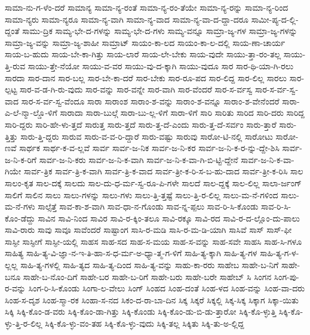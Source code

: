 {ಸಾಮಾ-ನು-ಗ-ಳೆಂ-ದರೆ
ಸಾಮಾನ್ಯ
ಸಾಮಾ-ನ್ಯ-ರಂತೆ
ಸಾಮಾ-ನ್ಯ-ರಂ-ತೆಯೇ
ಸಾಮಾ-ನ್ಯ-ರನ್ನು
ಸಾಮಾ-ನ್ಯ-ರಿಂದ
ಸಾಮಾ-ನ್ಯರು
ಸಾಮಾ-ನ್ಯರೂ
ಸಾಮಾ-ನ್ಯ-ವಾಗಿ
ಸಾಮಾ-ನ್ಯ-ವಾದ
ಸಾಮಾ-ನ್ಯ-ವಾ-ದ-ದ್ದಾ-ದರೂ
ಸಾಮೀ-ಪ್ಯ-ದ-ಲ್ಲಿ-ದ್ದಂತೆ
ಸಾಮು-ದ್ರಿಕ
ಸಾಮ್ಯ-ಭೇ-ದ-ಗಳನ್ನು
ಸಾಮ್ಯ-ಭೇ-ದ-ಗಳು
ಸಾಮ್ಯ-ವನ್ನೂ
ಸಾಮ್ರಾ-ಜ್ಯ-ಗಳ
ಸಾಮ್ರಾ-ಜ್ಯ-ಗಳನ್ನು
ಸಾಮ್ರಾ-ಜ್ಯ-ವನ್ನು
ಸಾಮ್ರಾ-ಜ್ಯ-ಶಾಹೀ
ಸಾಮ್ರಾಟ್
ಸಾಯಂ-ಕಾ-ಲದ
ಸಾಯಂ-ಕಾ-ಲ-ದಲ್ಲಿ
ಸಾಯ-ಣಾ-ಚಾರ್ಯ
ಸಾಯ-ಬ-ಹುದು
ಸಾಯ-ಬೇ-ಕಾ-ಗಿತ್ತು
ಸಾಯ-ಲಾರೆ
ಸಾಯ-ಲೇ-ಬೇಕು
ಸಾಯ-ವುದೇ
ಸಾಯು-ತ್ತಾ-ರಂ-ತಲ್ಲ
ಸಾಯು-ತ್ತಿ-ರುವ
ಸಾಯು-ತ್ತೇ-ನೆಯೋ
ಸಾಯು-ವ-ವರ
ಸಾಯು-ವು-ದ-ಕ್ಕಾಗಿ
ಸಾಯು-ವುದೂ
ಸಾರ
ಸಾರ-ಥಿ-ಯಾ-ಗಿ-ರಲು
ಸಾರದಾ
ಸಾರ-ದಾನ
ಸಾರ-ಬಲ್ಲ
ಸಾರ-ಬೇ-ಕಾ-ದರೆ
ಸಾರ-ಬೇಕು
ಸಾರ-ರೂ-ಪದ
ಸಾರ-ಲಿದ್ದ
ಸಾರ-ಲಿಲ್ಲ
ಸಾರಲು
ಸಾರ-ಲ್ಪಟ್ಟ
ಸಾರ-ವ-ಡ-ಗಿ-ರು-ವುದು
ಸಾರ-ವನ್ನು
ಸಾರ-ವನ್ನೇ
ಸಾರ-ವಾಗಿ
ಸಾರ-ವೆಂದರೆ
ಸಾರ-ಸ-ರ್ವಸ್ವ
ಸಾರ-ಸ-ರ್ವ-ಸ್ವ-ವಾದ
ಸಾರ-ಸ-ರ್ವ-ಸ್ವ-ವೆಂದೂ
ಸಾರಾ
ಸಾರಾಂಶ
ಸಾರಾಂ-ಶ-ವನ್ನು
ಸಾರಾಂ-ಶ-ವನ್ನೂ
ಸಾರಾಂ-ಶ-ವೇನೆಂದರೆ
ಸಾರಾ-ಎ-ಲೆ-ನ್ಮಾ-ಲ್ಡೊ-ಳಿಗೆ
ಸಾರಾದಾ
ಸಾರಾ-ಬುಲ್ಗೆ
ಸಾರಾ-ಬು-ಲ್ಲ-ಳಿಗೆ
ಸಾರಾ-ಳಿಗೆ
ಸಾರಿ
ಸಾರಿತು
ಸಾರಿದ
ಸಾರಿ-ದರು
ಸಾರಿದ್ದ
ಸಾರಿ-ದ್ದರು
ಸಾರಿ-ಹೇ-ಳು-ತ್ತದೆ
ಸಾರುತ್ತ
ಸಾರು-ತ್ತದೆ
ಸಾರು-ತ್ತ-ದೆ-ಎಂದು
ಸಾರು-ತ್ತ-ದೆ-ಸರ್ವಂ
ಸಾರು-ತ್ತಾರೆ
ಸಾರು-ತ್ತಿತ್ತು
ಸಾರು-ತ್ತಿ-ದ್ದರು
ಸಾರುವ
ಸಾರು-ವ-ವ-ರಿ-ದ್ದಾರೆ
ಸಾರು-ವಷ್ಟು
ಸಾರುವು
ಸಾರೋ-ಟಿ-ನಲ್ಲಿ
ಸಾರೋಟು
ಸಾರೋ-ಣವೆ
ಸಾರ್ಥಕ
ಸಾರ್ಥ-ಕ-ವ-ಲ್ಲವೆ
ಸಾರ್ವ
ಸಾರ್ವ-ಜ-ನಿಕ
ಸಾರ್ವ-ಜ-ನಿ-ಕರ
ಸಾರ್ವ-ಜ-ನಿ-ಕ-ರ-ನ್ನು-ದ್ದೇ-ಶಿಸಿ
ಸಾರ್ವ-ಜ-ನಿ-ಕ-ರಿಗೆ
ಸಾರ್ವ-ಜ-ನಿ-ಕರು
ಸಾರ್ವ-ಜ-ನಿ-ಕ-ವಾಗಿ
ಸಾರ್ವ-ಜ-ನಿ-ಕ-ವಾ-ಗಿ-ಬಿ-ಟ್ಟಿ-ದ್ದೇನೆ
ಸಾರ್ವ-ಜ-ನಿ-ಕ-ವಾ-ಗಿಯೇ
ಸಾರ್ವ-ತ್ರಿಕ
ಸಾರ್ವ-ತ್ರಿ-ಕ-ವಾಗಿ
ಸಾರ್ವ-ತ್ರಿ-ಕ-ವಾದ
ಸಾರ್ವ-ತ್ರೀ-ಕ-ರಿ-ಸ-ಬ-ಹು-ದಾದ
ಸಾರ್ವ-ತ್ರೀ-ಕ-ರಿಸಿ
ಸಾಲ
ಸಾಲಂ-ಕೃತ
ಸಾಲ-ದಕ್ಕೆ
ಸಾಲದು
ಸಾಲ-ದು-ಧ-ರ್ಮ-ಸ್ವ-ರೂ-ಪಿ-ಗಳೇ
ಸಾಲದೆ
ಸಾಲ-ದ್ದಕ್ಕೆ
ಸಾಲ-ಲಿಲ್ಲ
ಸಾಲಾ-ರ್ಜಂಗ್
ಸಾಲಿಗೆ
ಸಾಲಿನ
ಸಾಲು
ಸಾಲು-ಗಳನ್ನು
ಸಾಲು-ಗಳು
ಸಾಲು-ತ್ತಿ-ತ್ತಷ್ಟೆ
ಸಾಲು-ತ್ತಿ-ರ-ಲಿಲ್ಲ
ಸಾಲು-ಮ-ನೆ-ಗಳಿಂದ
ಸಾಲು-ಮ-ನೆ-ಗಳು
ಸಾಲ್ಸೆತ್ತೆ
ಸಾವ-ಕಾ-ಶ-ವಾಗಿ
ಸಾವ-ಧಾ-ನ-ಗೊಂಡು
ಸಾವ-ನ್ನ-ಪ್ಪಲು
ಸಾವ-ರಿ-ಸಿ-ಕೊಂಡು
ಸಾವ-ರಿ-ಸಿ-ಕೊಂ-ಡೆದ್ದು
ಸಾವಿನ
ಸಾವಿ-ನಿಂದ
ಸಾವಿರ
ಸಾವಿ-ರ-ಕ್ಕಿಂ-ತಲೂ
ಸಾವಿ-ರಕ್ಕೂ
ಸಾವಿ-ರದ
ಸಾವಿ-ರ-ದ-ಲ್ಲೊಂ-ದು-ಪಾಲು
ಸಾವಿ-ರಾರು
ಸಾವು
ಸಾವೂ
ಸಾವೆಂದರೆ
ಸಾಷ್ಟಾಂಗ
ಸಾಸಿ-ರ-ಮಡಿ
ಸಾಸಿ-ರ-ಮ-ಡಿ-ಯಾಗಿ
ಸಾಸಿವೆ
ಸಾಸ್
ಸಾಸ್-ಫೀ
ಸಾಸ್ಫೀ
ಸಾಸ್ಫೀಗೆ
ಸಾಸ್ಫೀ-ಯಲ್ಲಿ
ಸಾಹಸ
ಸಾಹ-ಸದ
ಸಾಹ-ಸ-ಮಯ
ಸಾಹ-ಸ-ವನ್ನು
ಸಾಹ-ಸವೇ
ಸಾಹಸಿ
ಸಾಹ-ಸಿ-ಗಳೂ
ಸಾಹಿತ್ಯ
ಸಾಹಿ-ತ್ಯ-ವಿ-ಜ್ಞಾ-ನ-ಇ-ತಿ-ಹಾ-ಸ-ಧ-ರ್ಮ-ಅ-ಧ್ಯಾ-ತ್ಮ-ಗ-ಳಿಗೆ
ಸಾಹಿ-ತ್ಯ-ಕ್ಕಾಗಿ
ಸಾಹಿ-ತ್ಯ-ಗಳ
ಸಾಹಿ-ತ್ಯ-ಗ-ಳ-ಲ್ಲಲ್ಲ
ಸಾಹಿ-ತ್ಯ-ಗಳಲ್ಲಿ
ಸಾಹಿ-ತ್ಯದ
ಸಾಹಿ-ತ್ಯ-ದಿಂದ
ಸಾಹಿ-ತ್ಯ-ವನ್ನು
ಸಾಹು-ಕಾ-ರರು
ಸಾಹೇಬ
ಸಾಹೇ-ಬ-ನಿಗೆ
ಸಾಹೇ-ಬನೂ
ಸಾಹೇ-ಬ-ನೊಂ-ದಿಗೆ
ಸಾಹೇ-ಬರ
ಸಾಹೇ-ಬ-ರಿಗೆ
ಸಾಹೇ-ಬರು
ಸಾಹೇ-ಬರೇ
ಸಾಹೇಬ್
ಸಿ
ಸಿಂಗನ
ಸಿಂಗ-ಪು-ರ-ವನ್ನು
ಸಿಂಗ-ರಿ-ಸಿ-ಕೊಂಡು
ಸಿಂಗಾ-ಲ-ವೇಲು
ಸಿಂಗ್
ಸಿಂಹದ
ಸಿಂಹ-ದಂತೆ
ಸಿಂಹ-ಳದ
ಸಿಂಹ-ವನ್ನು
ಸಿಂಹ-ವಾ-ದರು
ಸಿಂಹ-ಸ-ದೃಶ
ಸಿಂಹ-ಸ್ಮಾ-ರಕ
ಸಿಂಹಾ-ಸ-ನದ
ಸಿಕಂ-ದ-ರಾ-ಬಾ-ದಿನ
ಸಿಕ್ಕ
ಸಿಕ್ಕರೆ
ಸಿಕ್ಕಲ್ಲಿ
ಸಿಕ್ಕ-ಸಿಕ್ಕ
ಸಿಕ್ಕಾಗ
ಸಿಕ್ಕಾ-ಯಿತು
ಸಿಕ್ಕಿ
ಸಿಕ್ಕಿ-ಕೊಂ-ಡ-ವರು
ಸಿಕ್ಕಿ-ಕೊಂ-ಡಾ-ಗಿತ್ತು
ಸಿಕ್ಕಿ-ಕೊಂಡು
ಸಿಕ್ಕಿ-ಕೊಂ-ಡು-ಬಿ-ಡು-ತ್ತಾರೋ
ಸಿಕ್ಕಿ-ಕೊ-ಳ್ಳುತ್ತಿ
ಸಿಕ್ಕಿ-ಕೊ-ಳ್ಳು-ತ್ತಿ-ರ-ಲಿಲ್ಲ
ಸಿಕ್ಕಿ-ಕೊ-ಳ್ಳು-ವಂ-ತಹ
ಸಿಕ್ಕಿ-ಕೊ-ಳ್ಳು-ವುದು
ಸಿಕ್ಕಿ-ತಲ್ಲ
ಸಿಕ್ಕಿತು
ಸಿಕ್ಕಿ-ತು-ಅ-ಲ್ಲಿದ್ದ
}
